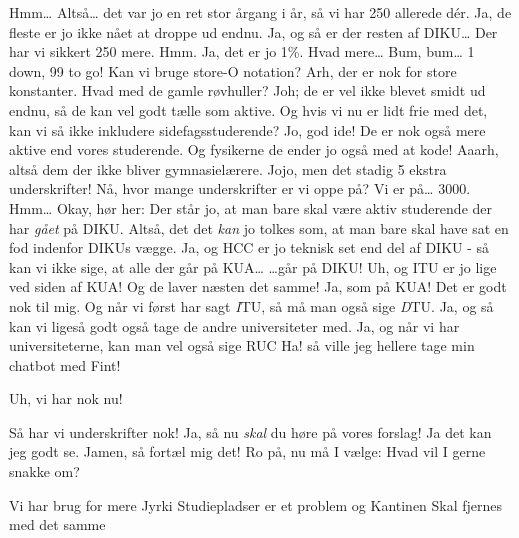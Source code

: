\documentclass[a4paper,11pt]{article}
\begin{document}
\begin{sketch}
 Hmm{\ldots} Altså{\ldots} det var jo en ret stor årgang i år, så vi har 250 allerede dér.
 Ja, de fleste er jo ikke nået at droppe ud endnu.
 Ja, og så er der resten af DIKU{\ldots} Der har vi sikkert 250 mere.
 Hmm. Ja, det er jo 1\%. Hvad mere{\ldots} Bum, bum{\ldots}
 1 down, 99 to go!
 Kan vi bruge store-O notation?
 Arh, der er nok for store konstanter.
 Hvad med de gamle røvhuller?
 Joh; de er vel ikke blevet smidt ud endnu, så de kan vel godt tælle som aktive.
 Og hvis vi nu er lidt frie med det, kan vi så ikke inkludere sidefagsstuderende?
 Jo, god ide! De er nok også mere aktive end vores studerende.
 Og fysikerne de ender jo også med at kode!
 Aaarh, altså dem der ikke bliver gymnasielærere.
 Jojo, men det stadig 5 ekstra underskrifter!
 Nå, hvor mange underskrifter er vi oppe på?
 Vi er på{\ldots} 3000. Hmm{\ldots}
 Okay, hør her: Der står jo, at man bare skal være aktiv studerende der har \emph{gået} på DIKU.
    Altså, det det \emph{kan} jo tolkes som, at man bare skal have sat en fod indenfor DIKUs vægge.
 Ja, og HCC er jo teknisk set end del af DIKU - så kan vi ikke sige, at alle der går på KUA{\ldots}
 {\ldots}går på DIKU!
 Uh, og ITU er jo lige ved siden af KUA!
 Og de laver næsten det samme!
 Ja, som på KUA! Det er godt nok til mig.
 Og når vi først har sagt \emph{I}TU, så må man også sige \emph{D}TU.
 Ja, og så kan vi ligeså godt også tage de andre universiteter med.
 Ja, og når vi har universiteterne, kan man vel også sige RUC
 Ha! så ville jeg hellere tage min chatbot med
 Fint!

 Uh, vi har nok nu!


 Så har vi underskrifter nok!
 Ja, så nu \emph{skal} du høre på vores forslag!
 Ja det kan jeg godt se. Jamen, så fortæl mig det!
 Ro på, nu må I vælge: Hvad vil I gerne snakke om?

 Vi har brug for mere
 Jyrki
 Studiepladser
 er et problem og
 Kantinen
 Skal fjernes med det samme

\end{sketch}
\end{document}

